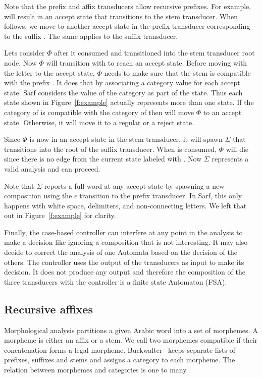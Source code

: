 \documentclass[11pt,letterpaper]{article}
\begin{document}
Note that the prefix and affix transducers allow recursive 
prefixes. For example,  will result in an accept state
that transitions to the stem transducer. 
When  follows, we move to another accept state in the 
prefix transducer corresponding to the suffix . 
The same applies to the suffix transducer. 

Lets consider $\Phi$ after it consumed  
and transitioned into the stem transducer root node. 
Now $\Phi$ will transition with  to reach an accept 
state. 
Before moving with the letter  to the accept state,
$\Phi$ needs to make sure that the stem  is compatible
with the prefix . 
It does that by associating a category value for each accept state. 
Sarf considers the value of the category as part of the state.
Thus each state shown in Figure~\ref{f:example} actually represents
more than one state. 
If the category of  is compatible with the category of
 then  will move $\Phi$ to an accept state. 
Otherwise, it will move it to a regular or a reject state. 

Since $\Phi$ is now in an accept state in the stem transducer, it will
spawn $\Sigma$ that transitions into the root of the 
suffix transducer. When  is consumed, $\Phi$ will die since 
there is no edge from the current state labeled with . 
Now $\Sigma$ represents a valid analysis and can proceed.

Note that $\Sigma$ reports a full word at any accept state
by spawning a new composition using the $\epsilon$ transition
to the prefix transducer.
In Sarf, this only happens with white space, delimiters, 
and non-connecting letters. 
We left that out in Figure~\ref{f:example} for clarity. 

Finally, the case-based controller can interfere at any point in the 
analysis to make a decision like ignoring a composition that 
is not interesting. 
It may also decide to correct the analysis of one Automata
based on the decision of the others. 
The controller uses the output of the transducers as input
to make its decision. 
It does not produce any output and therefore the composition
of the three transducers with the controller is a finite 
state Automaton (FSA). 

\subsection{Recursive affixes}
\label{sec:recaffix}

Morphological analysis partitions a given Arabic word
into a set of morphemes.
A morpheme is either an affix or a stem. 
We call two morphemes compatible if their concatenation
forms a legal morpheme. 
Buckwalter~ keeps separate lists 
of prefixes, suffixes and stems and assigns a category
to each morpheme. 
The relation between morphemes and categories is one 
to many. 
\end{document}
